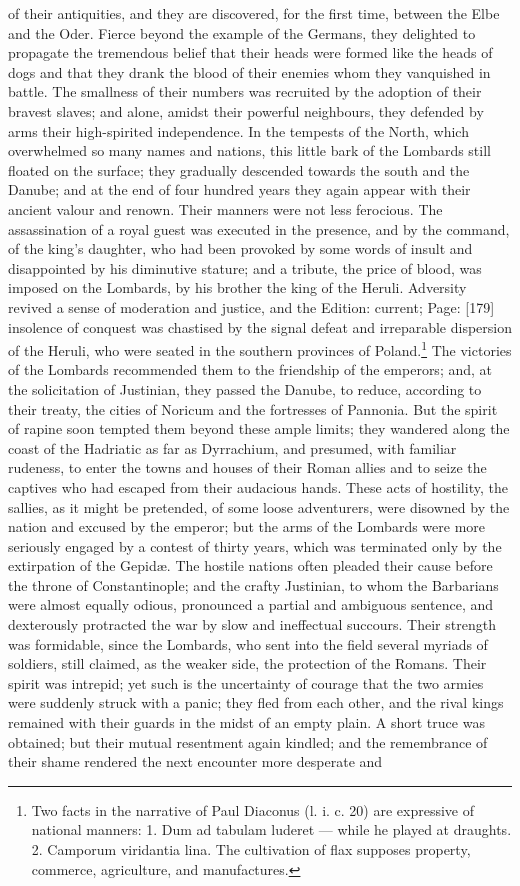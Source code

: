 of their antiquities, and they are discovered, for the first time, between the Elbe and the Oder. Fierce beyond the example of the Germans, they delighted to propagate the tremendous belief that their heads were formed like the heads of dogs and that they drank the blood of their enemies whom they vanquished in battle. The smallness of their numbers was recruited by the adoption of their bravest slaves; and alone, amidst their powerful neighbours, they defended by arms their high-spirited independence. In the tempests of the North, which overwhelmed so many names and nations, this little bark of the Lombards still floated on the surface; they gradually descended towards the south and the Danube; and at the end of four hundred years they again appear with their ancient valour and renown. Their manners were not less ferocious. The assassination of a royal guest was executed in the presence, and by the command, of the king\texthebrew{}’s daughter, who had been provoked by some words of insult and disappointed by his diminutive stature; and a tribute, the price of blood, was imposed on the Lombards, by his brother the king of the Heruli. Adversity revived a sense of moderation and justice, and the Edition: current; Page: [179] insolence of conquest was chastised by the signal defeat and irreparable dispersion of the Heruli, who were seated in the southern provinces of Poland.\footnote{Two facts in the narrative of Paul Diaconus (l. i. c. 20) are expressive of national manners: 1. Dum ad tabulam luderet \texthebrew{—} while he played at draughts. 2. Camporum viridantia lina. The cultivation of flax supposes property, commerce, agriculture, and manufactures.} The victories of the Lombards recommended them to the friendship of the emperors; and, at the solicitation of Justinian, they passed the Danube, to reduce, according to their treaty, the cities of Noricum and the fortresses of Pannonia. But the spirit of rapine soon tempted them beyond these ample limits; they wandered along the coast of the Hadriatic as far as Dyrrachium, and presumed, with familiar rudeness, to enter the towns and houses of their Roman allies and to seize the captives who had escaped from their audacious hands. These acts of hostility, the sallies, as it might be pretended, of some loose adventurers, were disowned by the nation and excused by the emperor; but the arms of the Lombards were more seriously engaged by a contest of thirty years, which was terminated only by the extirpation of the Gepidæ. The hostile nations often pleaded their cause before the throne of Constantinople; and the crafty Justinian, to whom the Barbarians were almost equally odious, pronounced a partial and ambiguous sentence, and dexterously protracted the war by slow and ineffectual succours. Their strength was formidable, since the Lombards, who sent into the field several myriads of soldiers, still claimed, as the weaker side, the protection of the Romans. Their spirit was intrepid; yet such is the uncertainty of courage that the two armies were suddenly struck with a panic; they fled from each other, and the rival kings remained with their guards in the midst of an empty plain. A short truce was obtained; but their mutual resentment again kindled; and the remembrance of their shame rendered the next encounter more desperate and 